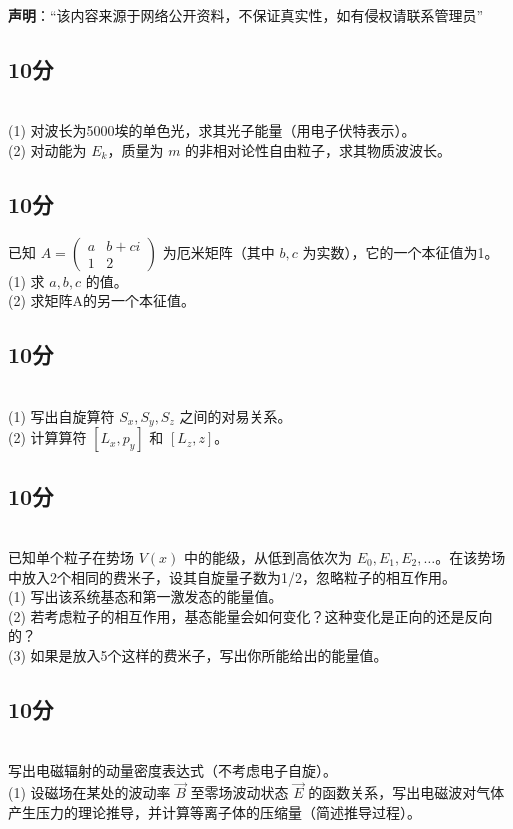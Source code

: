 
\textbf{声明}：“该内容来源于网络公开资料，不保证真实性，如有侵权请联系管理员”

\subsection{10分}\\
(1) 对波长为5000埃的单色光，求其光子能量（用电子伏特表示）。\\
(2) 对动能为 $E_k$，质量为 $m$ 的非相对论性自由粒子，求其物质波波长。
\subsection{10分}
已知 $A = \begin{pmatrix} a & b+ci \\ 1 & 2 \end{pmatrix}$ 为厄米矩阵（其中 $ b, c$ 为实数），它的一个本征值为1。\\
(1) 求 $a, b, c$ 的值。\\
(2) 求矩阵A的另一个本征值。
\subsection{10分}\\
(1) 写出自旋算符 $S_x, S_y, S_z$ 之间的对易关系。\\
(2) 计算算符 $[L_x, p_y]$ 和 $[L_z, z]$。
\subsection{10分}\\
已知单个粒子在势场 $V(x)$ 中的能级，从低到高依次为 $E_0, E_1, E_2, \dots$。在该势场中放入2个相同的费米子，设其自旋量子数为1/2，忽略粒子的相互作用。\\
(1) 写出该系统基态和第一激发态的能量值。\\
(2) 若考虑粒子的相互作用，基态能量会如何变化？这种变化是正向的还是反向的？\\
(3) 如果是放入5个这样的费米子，写出你所能给出的能量值。
\subsection{10分}\\
写出电磁辐射的动量密度表达式（不考虑电子自旋）。\\
(1) 设磁场在某处的波动率 $\vec{B}$ 至零场波动状态 $\vec{E}$ 的函数关系，写出电磁波对气体产生压力的理论推导，并计算等离子体的压缩量（简述推导过程）。

